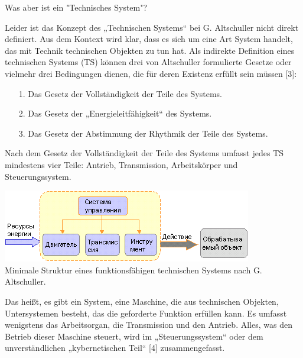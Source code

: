 \documentclass[11pt,a4paper]{article}
\begin{document}
Was aber ist ein "Technisches System"? 

Leider ist das Konzept des „Technischen Systems“ bei G. Altschuller nicht
direkt definiert. Aus dem Kontext wird klar, dass es sich um eine Art System
handelt, das mit Technik technischen Objekten zu tun hat. Als indirekte
Definition eines technischen Systems (TS) können drei von Altschuller
formulierte Gesetze oder vielmehr drei Bedingungen dienen, die für deren
Existenz erfüllt sein müssen [3]:
\begin{itemize}
\item[1.] Das Gesetz der Vollständigkeit der Teile des Systems. 
\item[2.] Das Gesetz der „Energieleitfähigkeit“ des Systems. 
\item[3.] Das Gesetz der Abstimmung der Rhythmik der Teile des Systems.
\end{itemize}
Nach dem Gesetz der Vollständigkeit der Teile des Systems umfasst jedes TS
mindestens vier Teile: Antrieb, Transmission, Arbeitskörper und
Steuerungssystem.
\begin{center}
 \includegraphics[width=.6\textwidth]{mts-1.png}\\ Minimale Struktur eines
 funktionsfähigen technischen Systems nach G. Altschuller.
\end{center}
Das heißt, es gibt ein System, eine Maschine, die aus technischen Objekten,
Untersystemen besteht, das die geforderte Funktion erfüllen kann. Es umfasst
wenigstens das Arbeitsorgan, die Transmission und den Antrieb. Alles, was den
Betrieb dieser Maschine steuert, wird im „Steuerungssystem“ oder dem
unverständlichen „kybernetischen Teil“ [4] zusammengefasst.
\end{document}
